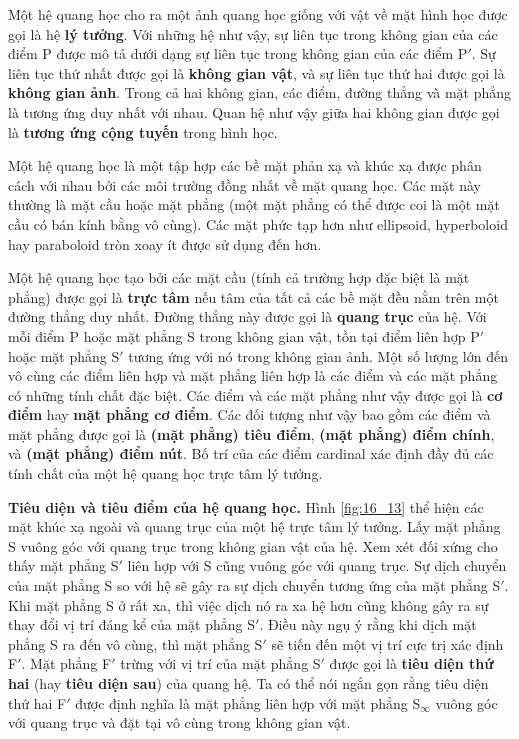 Một hệ quang học cho ra một ảnh quang học giống với vật về mặt hình học được gọi là hệ \textbf{lý tưởng}.
Với những hệ như vậy, sự liên tục trong không gian của các điểm P được mô tả dưới dạng sự liên tục trong không gian của các điểm P$'$.
Sự liên tục thứ nhất được gọi là \textbf{không gian vật}, và sự liên tục thứ hai được gọi là \textbf{không gian ảnh}.
Trong cả hai không gian, các điểm, đường thẳng và mặt phẳng là tương ứng duy nhất với nhau.
Quan hệ như vậy giữa hai không gian được gọi là \textbf{tương ứng cộng tuyến} trong hình học.

Một hệ quang học là một tập hợp các bề mặt phản xạ và khúc xạ được phân cách với nhau bởi các môi trường đồng nhất về mặt quang học.
Các mặt này thường là mặt cầu hoặc mặt phẳng (một mặt phẳng có thể được coi là một mặt cầu có bán kính bằng vô cùng).
Các mặt phức tạp hơn như ellipsoid, hyperboloid hay paraboloid tròn xoay ít được sử dụng đến hơn.

Một hệ quang học tạo bởi các mặt cầu (tính cả trường hợp đặc biệt là mặt phẳng) được gọi là \textbf{trực tâm} nếu tâm của tất cả các bề mặt đều nằm trên một đường thẳng duy nhất.
Đường thẳng này được gọi là \textbf{quang trục} của hệ.
Với mỗi điểm P hoặc mặt phẳng S trong không gian vật, tồn tại điểm liên hợp P$'$ hoặc mặt phẳng S$'$ tương ứng với nó trong không gian ảnh.
Một số lượng lớn đến vô cùng các điểm liên hợp và mặt phẳng liên hợp là các điểm và các mặt phẳng có những tính chất đặc biệt.
Các điểm và các mặt phẳng như vậy được gọi là \textbf{cơ điểm} hay \textbf{mặt phẳng cơ điểm}.
Các đối tượng như vậy bao gồm các điểm và mặt phẳng được gọi là \textbf{(mặt phẳng) tiêu điểm}, \textbf{(mặt phẳng) điểm chính}, và \textbf{(mặt phẳng) điểm nút}.
Bố trí của các điểm cardinal xác định đầy đủ các tính chất của một hệ quang học trực tâm lý tưởng.

\textbf{Tiêu diện và tiêu điểm của hệ quang học.}
Hình \ref{fig:16_13} thể hiện các mặt khúc xạ ngoài và quang trục của một hệ trực tâm lý tưởng.
Lấy mặt phẳng S vuông góc với quang trục trong không gian vật của hệ.
Xem xét đối xứng cho thấy mặt phẳng S$'$ liên hợp với S cũng vuông góc với quang trục.
Sự dịch chuyển của mặt phẳng S so với hệ sẽ gây ra sự dịch chuyển tương ứng của mặt phẳng S$'$.
Khi mặt phẳng S ở rất xa, thì việc dịch nó ra xa hệ hơn cũng không gây ra sự thay đổi vị trí đáng kể của mặt phẳng S$'$.
Điều này ngụ ý rằng khi dịch mặt phẳng S ra đến vô cùng, thì mặt phẳng S$'$ sẽ tiến đến một vị trí cực trị xác định F$'$. Mặt phẳng F$'$ trừng với vị trí của mặt phẳng S$'$ được gọi là \textbf{tiêu diện thứ hai} (hay \textbf{tiêu diện sau}) của quang hệ.
Ta có thể nói ngắn gọn rằng tiêu diện thứ hai F$'$ được định nghĩa là mặt phẳng liên hợp với mặt phẳng S$_{\infty}$ vuông góc với quang trục và đặt tại vô cùng trong không gian vật.

